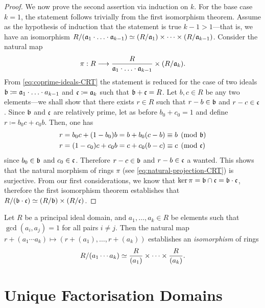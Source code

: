 \begin{proof}
We now prove the second assertion via induction on \(k\). For the base case
\(k = 1\), the statement follows trivially from the first isomorphism
theorem. Assume as the hypothesis of induction that the statement is true
\(k - 1 > 1\)---that is, we have an isomorphism
\(R/(\mathfrak{a}_1 \cdot \ldots \cdot \mathfrak{a}_{k-1}) \simeq (R/\mathfrak{a}_1) \times
\dots \times (R/\mathfrak{a}_{k-1})\). Consider the natural map
\begin{equation}\label{eq:natural-projection-CRT}
\pi: R \longrightarrow \frac{R}{\mathfrak{a}_{1} \cdot \ldots \cdot \mathfrak{a}_{k-1}}
\times (R/\mathfrak{a}_k).
\end{equation}
From \cref{eq:coprime-ideals-CRT} the statement is reduced for the case of two
ideals \(\mathfrak{b} \coloneq \mathfrak{a}_1 \cdot \ldots \cdot a_{k-1}\) and
\(\mathfrak{c} \coloneq \mathfrak{a}_k\) such that \(\mathfrak{b} + \mathfrak{c} = R\). Let
\(b, c \in R\) be any two elements---we shall show that there exists \(r \in R\)
such that \(r - b \in \mathfrak{b}\) and \(r - c \in \mathfrak{c}\). Since \(\mathfrak{b}\)
and \(\mathfrak{c}\) are relatively prime, let as before \(b_0 + c_0 = 1\) and
define \(r \coloneq b_0 c + c_0 b\). Then, one has
\begin{align*}
  r &= b_0 c + (1 - b_0) b = b + b_0 (c - b) \equiv b \pmod{\mathfrak{b}} \\
  r &= (1 - c_0) c + c_0 b = c + c_0 (b - c) \equiv c \pmod{\mathfrak{c}}
\end{align*}
since \(b_0 \in \mathfrak{b}\) and \(c_0 \in \mathfrak{c}\). Therefore
\(r - c \in \mathfrak{b}\) and \(r - b \in \mathfrak{c}\) a wanted. This shows that the
natural morphism of rings \(\pi\) (see \cref{eq:natural-projection-CRT}) is
surjective. From our first considerations, we know that
\(\ker \pi = \mathfrak{b} \cap \mathfrak{c} = \mathfrak{b} \cdot \mathfrak{c}\), therefore the
first isomorphism theorem establishes that
\(R/(\mathfrak{b} \cdot \mathfrak{c}) \simeq (R/\mathfrak{b}) \times (R/\mathfrak{c})\).
\end{proof}

\begin{corollary}
\label{cor:chinese-remainder-for-PID}
Let \(R\) be a principal ideal domain, and \(a_1, \dots, a_k \in R\) be elements
such that \(\gcd(a_i, a_j) = 1\) for all pairs \(i \neq j\). Then the natural
map \(r + (a_1 \cdots a_k) \mapsto (r + (a_1), \dots, r + (a_k))\) establishes an
\emph{isomorphism} of rings
\[
R/(a_1 \cdots a_k) \simeq \frac{R}{(a_{1})} \times \dots \times \frac{R}{(a_k)}.
\]
\end{corollary}

\section{Unique Factorisation Domains}


